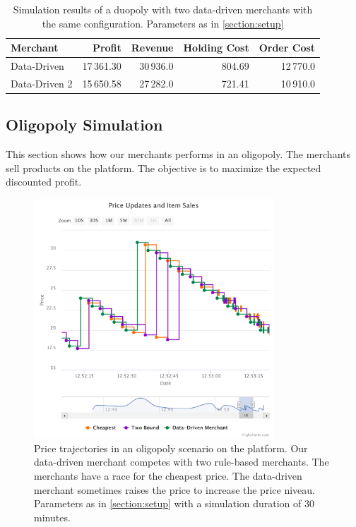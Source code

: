 \begin{table}[t]
	\centering
	\begin{tabular}{lrrrr}
		\toprule
		\textbf{Merchant} & \textbf{Profit} & \textbf{Revenue} & \textbf{Holding Cost} & \textbf{Order Cost} \\
		\midrule
		Data-Driven   & 17\,361.30 & 30\,936.0 & 804.69 & 12\,770.0 \\
		Data-Driven 2 & 15\,650.58 & 27\,282.0 & 721.41 & 10\,910.0 \\
		\bottomrule
	\end{tabular}
	\caption[Simulation Results: Data-Driven Merchant versus Data-Driven Merchant]{Simulation results of a duopoly with two data-driven merchants with the same configuration. Parameters as in \cref{section:setup}}
	\label{tab:duopoly_data}
\end{table}

\subsection{Oligopoly Simulation}
\label{section:oligopoly}
This section shows how our merchants performs in an oligopoly.
The merchants sell products on the \pricewars platform.
The objective is to maximize the expected discounted profit.

\begin{figure}[t]
	\centering
	\includegraphics[width=0.8\textwidth]{figures/competition_prices.pdf}
	\caption[Price Trajectories in Oligopoly Scenario]{Price trajectories in an oligopoly scenario on the \pricewars platform. Our data-driven merchant competes with two rule-based merchants. The merchants have a race for the cheapest price. The data-driven merchant sometimes raises the price to increase the price niveau. Parameters as in \cref{section:setup} with a simulation duration of 30 minutes.}
	\label{fig:competition_prices}
\end{figure}

